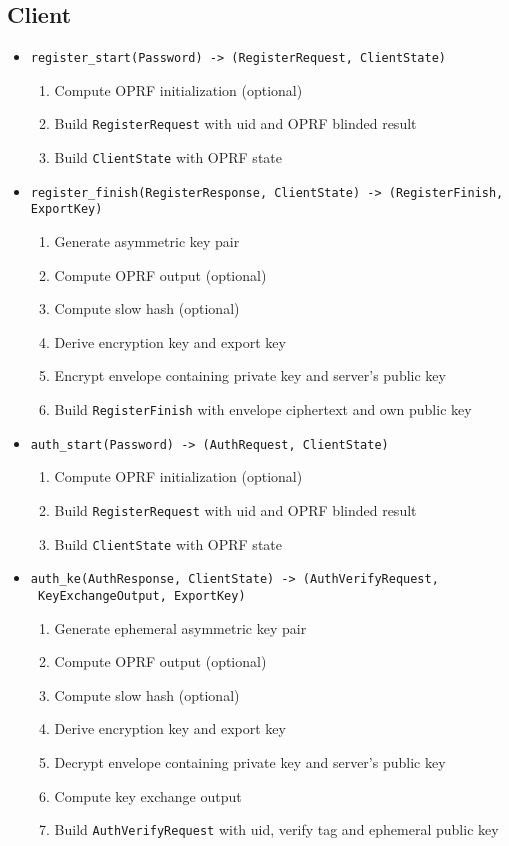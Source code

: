 \documentclass[../report.tex]{subfiles}
\begin{document}
\subsection{Client}
\begin{itemize}
 \item \verb|register_start(Password) -> (RegisterRequest, ClientState)|
  \begin{enumerate}
    \item Compute OPRF initialization (optional)
    \item Build \verb|RegisterRequest| with uid and OPRF blinded result
    \item Build \verb|ClientState| with OPRF state
  \end{enumerate}
  
 \item \verb|register_finish(RegisterResponse, ClientState) -> (RegisterFinish, ExportKey)|
  \begin{enumerate}
    \item Generate asymmetric key pair
    \item Compute OPRF output (optional)
    \item Compute slow hash (optional)
    \item Derive encryption key and export key
    \item Encrypt envelope containing private key and server's public key
    \item Build \verb|RegisterFinish| with envelope ciphertext and own public key
  \end{enumerate}
 
 
 
 \item \verb|auth_start(Password) -> (AuthRequest, ClientState)|
   \begin{enumerate}
    \item Compute OPRF initialization (optional)
    \item Build \verb|RegisterRequest| with uid and OPRF blinded result
    \item Build \verb|ClientState| with OPRF state
  \end{enumerate}
  
 \item \verb|auth_ke(AuthResponse, ClientState) -> (AuthVerifyRequest,|\\
       \verb| KeyExchangeOutput, ExportKey)|
  \begin{enumerate}
    \item Generate ephemeral asymmetric key pair
    \item Compute OPRF output (optional)
    \item Compute slow hash (optional)
    \item Derive encryption key and export key
    \item Decrypt envelope containing private key and server's public key
    \item Compute key exchange output
    \item Build \verb|AuthVerifyRequest| with uid, verify tag and ephemeral public key
  \end{enumerate}
 

\end{itemize}
\end{document}
